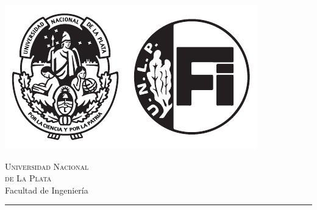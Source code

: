 \begin{titlepage}
	\begin{center}
		\vspace*{0.5cm}
		\begin{minipage}{8.0cm}
			\begin{flushright}
				\includegraphics{images/DobleLogo}
			\end{flushright}
		\end{minipage}
		\begin{minipage}{8.0cm}
			\begin{flushleft}
				\textsc{\huge Universidad Nacional }\\[0.1cm]
				\textsc{\huge de La Plata}\\[0.3cm]
				{\LARGE Facultad de Ingeniería}\\[0.15cm]
				{\Large \departamento}
			\end{flushleft}
		\end{minipage}
		
		\vspace{6cm}
		
		\textsc{\Huge \titulo}\vspace{0.5cm}
		\hrule\vspace{0.3cm}
		\textsc{\LARGE \subtitulo}
		
		\vspace{10.0cm}
		
		\textsc{\large \autor}\\[0.1cm]
		\textsc{\textsc{\fecha}}
		
	\end{center}
\end{titlepage}